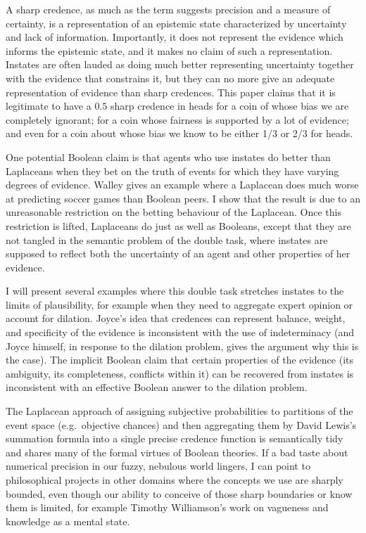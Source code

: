 \documentclass[11pt]{article}
\begin{document}
A sharp credence, as much as the term suggests precision and a measure
of certainty, is a representation of an epistemic state characterized
by uncertainty and lack of information. Importantly, it does not
represent the evidence which informs the epistemic state, and it makes
no claim of such a representation. Instates are often lauded as doing
much better representing uncertainty together with the evidence that
constrains it, but they can no more give an adequate representation of
evidence than sharp credences. This paper claims that it is legitimate
to have a $0.5$ sharp credence in heads for a coin of whose bias we
are completely ignorant; for a coin whose fairness is supported by a
lot of evidence; and even for a coin about whose bias we know to be
either 1/3 or 2/3 for heads.

One potential Boolean claim is that agents who use instates do better
than Laplaceans when they bet on the truth of events for which they
have varying degrees of evidence. Walley gives an example where
a Laplacean does much worse at predicting soccer games than Boolean
peers. I show that the result is due to an unreasonable restriction on
the betting behaviour of the Laplacean. Once this restriction is
lifted, Laplaceans do just as well as Booleans, except that they are
not tangled in the semantic problem of the double task, where instates
are supposed to reflect both the uncertainty of an agent and other
properties of her evidence.

I will present several examples where this double task stretches
instates to the limits of plausibility, for example when they need to
aggregate expert opinion or account for dilation. Joyce's idea that
credences can represent balance, weight, and specificity of the
evidence is inconsistent with the use of indeterminacy (and Joyce
himself, in response to the dilation problem, gives the argument why
this is the case). The implicit Boolean claim that certain properties
of the evidence (its ambiguity, its completeness, conflicts within it)
can be recovered from instates is inconsistent with an effective
Boolean answer to the dilation problem.

The Laplacean approach of assigning subjective probabilities to
partitions of the event space (e.g.\ objective chances) and then
aggregating them by David Lewis's summation formula into a single
precise credence function is semantically tidy and shares many of the
formal virtues of Boolean theories. If a bad taste about numerical
precision in our fuzzy, nebulous world lingers, I can point to
philosophical projects in other domains where the concepts we use are
sharply bounded, even though our ability to conceive of those sharp
boundaries or know them is limited, for example Timothy Williamson's
work on vagueness and knowledge as a mental state.
\end{document}
